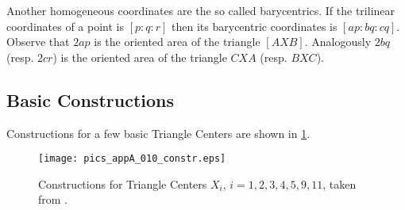 \begin{remark} \label{rem:baricentro_coord}
Another homogeneous coordinates are the so called {barycentrics}. If the   trilinear coordinates of a point is $[p:q:r]$  then its barycentric coordinates is $[ap:bq:cq]$. Observe that $2ap$ is the oriented area of the triangle $[AXB]$. Analogously $2bq$ (resp. $2cr$) is the oriented area of the triangle $CXA$ (resp. $BXC$).
\end{remark}

\subsection*{Basic Constructions}

Constructions for a few basic Triangle Centers are shown in \cref{fig:constructions}.

\begin{figure}[H]
    \centering
   \texttt{[image: pics\_appA\_010\_constr.eps]}
    \caption{Constructions for Triangle Centers $X_i$, $i=1,2,3,4,5,9,11$, taken from \cite{reznik2020-intelligencer}.}
    \label{fig:constructions}
\end{figure}

